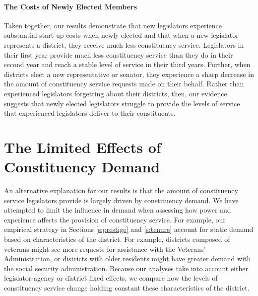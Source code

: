 \documentclass[12pt]{article}
\begin{document}
\paragraph{The Costs of Newly Elected Members} Taken together, our results demonstrate that new legislators experience substantial start-up costs when newly elected and that when a new legislator represents a district, they receive much less constituency service.  Legislators in their first year provide much less constituency service than they do in their second year and reach a stable level of service in their third years.  Further, when districts elect a new representative or senator, they experience a sharp decrease in the amount of constituency service requests made on their behalf.  Rather than experienced legislators forgetting about their districts, then, our evidence suggests that newly elected legislators struggle to provide the levels of service that experienced legislators deliver to their constituents.  
 


\section{The Limited Effects of Constituency Demand}\label{s:demand} 

An alternative explanation for our results is that the amount of constituency service legislators provide is largely driven by constituency demand.  We have attempted to limit the influence in demand when assessing how power and experience affects the provision of constituency service.  For example, our empirical strategy in Sections \ref{s:prestige} and \ref{s:tenure} account for static demand based on characteristics of the district.  For example, districts composed of veterans might see more requests for assistance with the Veterans' Administration, or districts with older residents might have greater demand with the social security administration.  Because our analyses take into account either legislator-agency or district fixed effects, we compare how the levels of constituency service change holding constant these characteristics of the district.  
\end{document}
